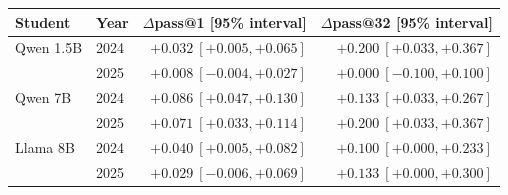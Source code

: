 \begin{tabular}{llrr}
\toprule
Student & Year & $\Delta$pass@1 [95\% interval] & $\Delta$pass@32 [95\% interval]\\
\midrule
Qwen 1.5B & 2024 & $+0.032\ [+0.005,+0.065]$ & $+0.200\ [+0.033,+0.367]$\\
 & 2025 & $+0.008\ [-0.004,+0.027]$ & $+0.000\ [-0.100,+0.100]$\\
Qwen 7B & 2024 & $+0.086\ [+0.047,+0.130]$ & $+0.133\ [+0.033,+0.267]$\\
 & 2025 & $+0.071\ [+0.033,+0.114]$ & $+0.200\ [+0.033,+0.367]$\\
Llama 8B & 2024 & $+0.040\ [+0.005,+0.082]$ & $+0.100\ [+0.000,+0.233]$\\
 & 2025 & $+0.029\ [-0.006,+0.069]$ & $+0.133\ [+0.000,+0.300]$\\
\bottomrule
\end{tabular}
